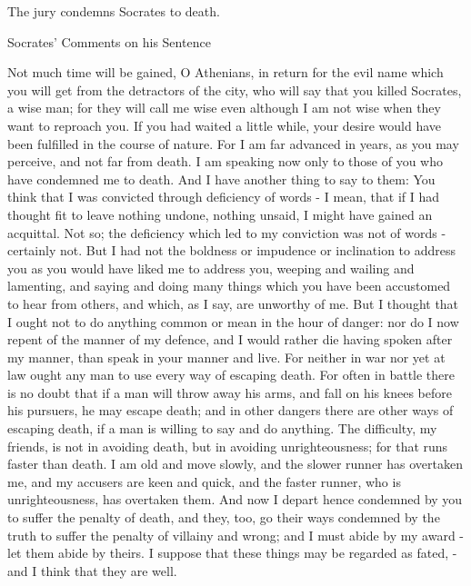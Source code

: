 \documentclass[11pt]{article}
\begin{document}
The jury condemns Socrates to death.

Socrates' Comments on his Sentence

Not much time will be gained, O Athenians, in return for the evil name which you will get from the detractors of the city, who will say that you killed Socrates, a wise man; for they will call me wise even although I am not wise when they want to reproach you. If you had waited a little while, your desire would have been fulfilled in the course of nature. For I am far advanced in years, as you may perceive, and not far from death. I am speaking now only to those of you who have condemned me to death. And I have another thing to say to them: You think that I was convicted through deficiency of words - I mean, that if I had thought fit to leave nothing undone, nothing unsaid, I might have gained an acquittal. Not so; the deficiency which led to my conviction was not of words - certainly not. But I had not the boldness or impudence or inclination to address you as you would have liked me to address you, weeping and wailing and lamenting, and saying and doing many things which you have been accustomed to hear from others, and which, as I say, are unworthy of me. But I thought that I ought not to do anything common or mean in the hour of danger: nor do I now repent of the manner of my defence, and I would rather die having spoken after my manner, than speak in your manner and live. For neither in war nor yet at law ought any man to use every way of escaping death. For often in battle there is no doubt that if a man will throw away his arms, and fall on his knees before his pursuers, he may escape death; and in other dangers there are other ways of escaping death, if a man is willing to say and do anything. The difficulty, my friends, is not in avoiding death, but in avoiding unrighteousness; for that runs faster than death. I am old and move slowly, and the slower runner has overtaken me, and my accusers are keen and quick, and the faster runner, who is unrighteousness, has overtaken them. And now I depart hence condemned by you to suffer the penalty of death, and they, too, go their ways condemned by the truth to suffer the penalty of villainy and wrong; and I must abide by my award - let them abide by theirs. I suppose that these things may be regarded as fated, - and I think that they are well.
\end{document}
